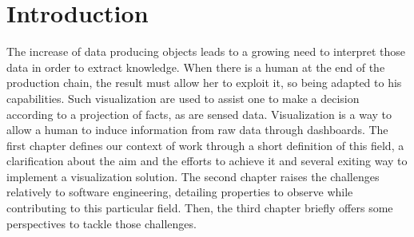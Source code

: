 \documentclass{acm_proc_article-sp}
\begin{document}
\section{Introduction}
The increase of data producing objects leads to a growing need to
interpret those data in order to extract knowledge. When there is a
human at the end of the production chain, the result must allow her to
exploit it, so being adapted to his capabilities. Such visualization
are used to assist one to make a decision according to a projection of
facts, as are sensed data. Visualization is a way to allow a human to
induce information from raw data through dashboards. The first chapter
defines our context of work through a short definition of this field,
a clarification about the aim and the efforts to achieve it and
several exiting way to implement a visualization solution. The second
chapter raises the challenges relatively to software engineering,
detailing properties to observe while contributing to this particular
field. Then, the third chapter briefly offers some perspectives to
tackle those challenges.
\end{document}
